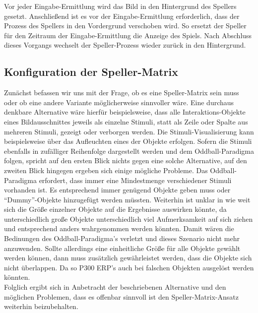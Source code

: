 Vor jeder Eingabe-Ermittlung wird das Bild in den Hintergrund des Spellers gesetzt. 
Anschließend ist es vor der Eingabe-Ermittlung erforderlich, dass der Prozess des Spellers in den Vordergrund verschoben wird.
So ersetzt der Speller für den Zeitraum der Eingabe-Ermittlung die Anzeige des Spiels. 
Nach Abschluss dieses Vorgangs wechselt der Speller-Prozess wieder zurück in den Hintergrund.\\





\pagebreak
\subsection{Konfiguration der Speller-Matrix}
\vspace{0.3cm}

Zunächst befassen wir uns mit der Frage, ob es eine Speller-Matrix sein muss oder ob eine andere Variante möglicherweise sinnvoller wäre.
Eine durchaus denkbare Alternative wäre hierfür beispielsweise, dass alle Interaktions-Objekte eines Bildausschnittes jeweils als einzelne Stimuli, 
statt als Zeile oder Spalte aus mehreren Stimuli, gezeigt oder verborgen werden. 
Die Stimuli-Visualisierung kann beispielsweise über das Aufleuchten eines der Objekte erfolgen.
Sofern die Stimuli ebenfalls in zufälliger Reihenfolge dargestellt werden und dem Oddball-Paradigma folgen, spricht auf den ersten Blick nichts gegen eine solche Alternative,
auf den zweiten Blick hingegen ergeben sich einige mögliche Probleme.
Das Oddball-Paradigma erfordert, dass immer eine Mindestmenge verschiedener Stimuli vorhanden ist.
Es entsprechend immer genügend Objekte geben muss oder "`Dummy"'-Objekte hinzugefügt werden müssten.
Weiterhin ist unklar in wie weit sich die Größe einzelner Objekte auf die Ergebnisse auswirken könnte, 
da unterschiedlich große Objekte unterschiedlich viel Aufmerksamkeit auf sich ziehen und entsprechend anders wahrgenommen werden könnten.
Damit wären die Bedinungen des Oddball-Paradigma's verletzt und dieses Szenario nicht mehr anzuwenden.
Sollte allerdings eine einheitliche Größe für alle Objekte gewählt werden können, dann muss zusätzlich gewährleistet werden, dass die Objekte sich nicht überlappen.
Da so \acs{P300 ERP}'s auch bei falschen Objekten ausgelöst werden könnten.\\

Folglich ergibt sich in Anbetracht der beschriebenen Alternative und den möglichen Problemen, dass es offenbar sinnvoll ist den Speller-Matrix-Ansatz weiterhin beizubehalten.\\



